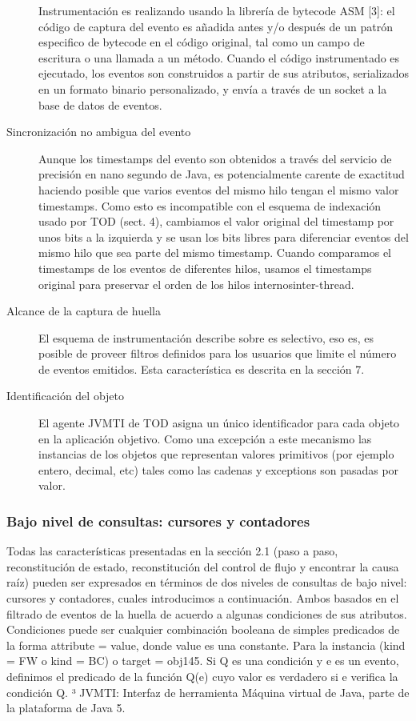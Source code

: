 \documentclass[12pt,a4paper]{report}
\begin{document}
\begin{description}
Instrumentación es realizando usando la librería de bytecode ASM [3]:  el código de captura  del evento es añadida antes y/o después de un patrón especifico de bytecode en el código original, tal como un campo de escritura o una llamada a un método.  Cuando el código instrumentado es ejecutado, los eventos son construidos a partir de sus atributos, serializados en un formato binario personalizado, y envía a través de un socket a la base de datos de eventos.

	\item[Sincronización no ambigua del evento] Aunque los timestamps del evento son obtenidos a través del servicio de precisión en nano segundo de Java, es potencialmente carente de exactitud haciendo posible que varios eventos del mismo hilo tengan el mismo valor timestamps.  Como esto es incompatible con el esquema de indexación usado por TOD (sect. 4), cambiamos el valor original del timestamp por unos bits a la izquierda y se usan los bits libres para diferenciar eventos del mismo hilo que sea parte del mismo timestamp.  Cuando comparamos el timestamps de los eventos de diferentes hilos, usamos el timestamps original para preservar el orden de los hilos internos{inter-thread}.

	\item[Alcance de la captura de huella] El esquema de instrumentación describe sobre es selectivo, eso es, es posible de proveer filtros definidos para los usuarios que limite el número de eventos emitidos.  Esta característica es descrita en la sección 7.

	\item[Identificación del objeto] El agente JVMTI de TOD asigna un único identificador para cada objeto en la aplicación objetivo.  Como una excepción a este mecanismo las instancias de los objetos que representan valores primitivos (por ejemplo entero, decimal, etc) tales como las cadenas y exceptions son pasadas por valor.
\end{description}

			\subsubsection[Bajo nivel de consultas]{Bajo nivel de consultas: cursores y contadores}

	Todas las características presentadas en la sección 2.1 (paso a paso, reconstitución de estado, reconstitución del control de flujo y encontrar la causa raíz) pueden ser expresados en términos de dos niveles de consultas de bajo nivel:  cursores y contadores, cuales introducimos a continuación.  Ambos basados en el filtrado de eventos de la huella de acuerdo a algunas condiciones de sus atributos.  Condiciones puede ser cualquier combinación booleana de simples predicados de la forma attribute = value, donde value es una constante.  Para la instancia (kind = FW o kind = BC) o target = obj145.  Si Q es una condición y e es un evento, definimos el predicado de la función Q(e) cuyo valor es verdadero si e verifica la condición Q.
³ JVMTI: Interfaz de herramienta Máquina virtual de Java, parte de la plataforma de Java 5.
	
\end{document}

